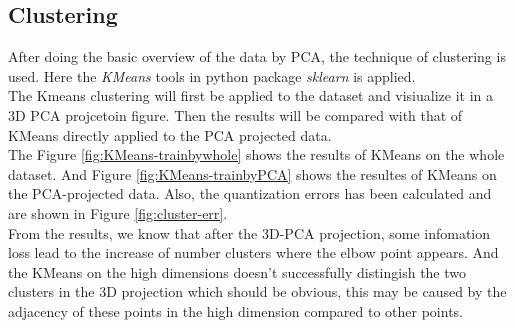 \documentclass[12pt]{article}
\begin{document}
\subsection{Clustering}
After doing the basic overview of the data by PCA, the technique of clustering is used. Here the \textit{KMeans} tools in python package \textit{sklearn} is applied. \\
The Kmeans clustering will first be applied to the dataset and visiualize it in a 3D PCA projcetoin figure. Then the results will be compared with that of KMeans directly applied to the PCA projected data.\\
The Figure \ref{fig:KMeans-trainbywhole} shows the results of KMeans on the whole dataset. And Figure \ref{fig:KMeans-trainbyPCA} shows the resultes of KMeans on the PCA-projected data. Also, the quantization errors has been calculated and are shown in Figure \ref{fig:cluster-err}.\\
From the results, we know that after the 3D-PCA projection, some infomation loss lead to the increase of number clusters where the elbow point appears. And the KMeans on the high dimensions doesn't successfully distingish the two clusters in the 3D projection which should be obvious, this may be caused by the adjacency of these points in the high dimension compared to other points.
\end{document}
